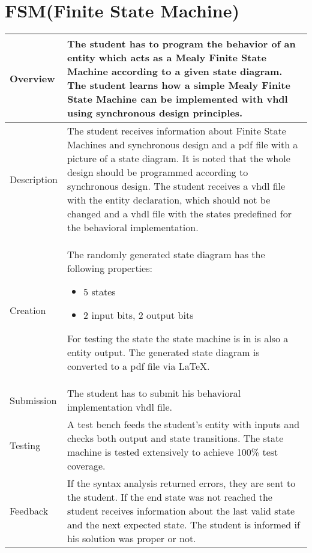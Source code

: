 \section{FSM(Finite State Machine)}\label{finitestatemachine}
    \begin{tabular}{|p{2cm}|p{11cm}|}
        \hline
        Overview & The student has to program the behavior of an entity which acts as a Mealy Finite 
        State Machine according to a given state diagram. The student learns how a simple Mealy Finite
        State Machine can be implemented with vhdl using synchronous design principles.
        \\
        \hline
        Description & The student receives information about Finite State Machines and synchronous
        design and a pdf file with a picture of a state diagram. It is noted that the whole design should be 
        programmed according to synchronous design. The student receives a vhdl file with the 
        entity declaration, which should not be changed and a vhdl file with the states predefined 
        for the behavioral implementation.
        \\
        \hline
        Creation &  The randomly generated state diagram has the following properties:
        \begin{itemize}
            \item 5 states
            \item 2 input bits, 2 output bits
        \end{itemize}
        For testing the state the state machine is in is also a entity output. The generated state diagram 
        is converted to a pdf file via \LaTeX. 
        \\
        \hline
        Submission & The student has to submit his behavioral implementation vhdl file.
        \\
        \hline
        Testing & A test bench feeds the student's entity with inputs and checks both output and state
        transitions. The state machine is tested extensively to achieve 100\% test coverage. 
        \\
        \hline
        Feedback & If the syntax analysis returned errors, they are sent to the student. If the end 
        state was not reached the student receives information about the last valid state and the next 
        expected state. The student is informed if his solution was proper or not.
        \\
        \hline 
    \end{tabular}


